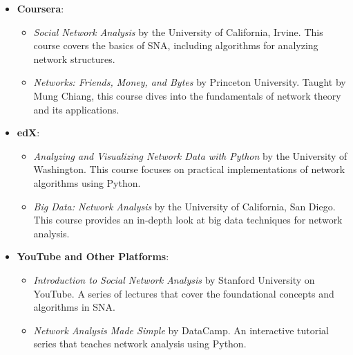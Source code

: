\documentclass[12pt]{book} %
\begin{document}
\begin{itemize}
    \item \textbf{Coursera}:
        \begin{itemize}
            \item \textit{Social Network Analysis} by the University of California, Irvine. This course covers the basics of SNA, including algorithms for analyzing network structures.
            \item \textit{Networks: Friends, Money, and Bytes} by Princeton University. Taught by Mung Chiang, this course dives into the fundamentals of network theory and its applications.
        \end{itemize}
    
    \item \textbf{edX}:
        \begin{itemize}
            \item \textit{Analyzing and Visualizing Network Data with Python} by the University of Washington. This course focuses on practical implementations of network algorithms using Python.
            \item \textit{Big Data: Network Analysis} by the University of California, San Diego. This course provides an in-depth look at big data techniques for network analysis.
        \end{itemize}
    
    \item \textbf{YouTube and Other Platforms}:
        \begin{itemize}
            \item \textit{Introduction to Social Network Analysis} by Stanford University on YouTube. A series of lectures that cover the foundational concepts and algorithms in SNA.
            \item \textit{Network Analysis Made Simple} by DataCamp. An interactive tutorial series that teaches network analysis using Python.
        \end{itemize}
\end{itemize}
\end{document}
